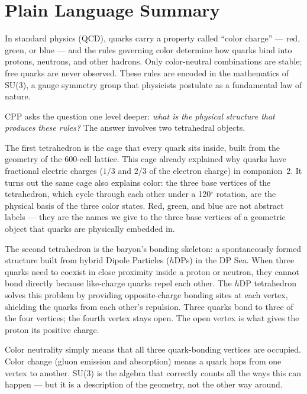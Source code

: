 \documentclass[12pt]{article}
\newcommand{\hDP}{h\mathrm{DP}}
\begin{document}
\section*{Plain Language Summary}

In standard physics (QCD), quarks carry a property called ``color
charge'' --- red, green, or blue --- and the rules governing color
determine how quarks bind into protons, neutrons, and other hadrons.
Only color-neutral combinations are stable; free quarks are never
observed.  These rules are encoded in the mathematics of SU(3), a
gauge symmetry group that physicists postulate as a fundamental law
of nature.

CPP asks the question one level deeper: \emph{what is the physical
structure that produces these rules?}  The answer involves two
tetrahedral objects.

The first tetrahedron is the cage that every quark sits inside,
built from the geometry of the 600-cell lattice.  This cage already
explained why quarks have fractional electric charges ($1/3$ and
$2/3$ of the electron charge) in companion~2.  It turns out the same
cage also explains color: the three base vertices of the tetrahedron,
which cycle through each other under a 120$^\circ$ rotation, are
the physical basis of the three color states.  Red, green, and blue
are not abstract labels --- they are the names we give to the three
base vertices of a geometric object that quarks are physically
embedded in.

The second tetrahedron is the baryon's bonding skeleton: a
spontaneously formed structure built from hybrid Dipole Particles
($\hDP$s) in the DP Sea.  When three quarks need to coexist in close
proximity inside a proton or neutron, they cannot bond directly
because like-charge quarks repel each other.  The $\hDP$ tetrahedron
solves this problem by providing opposite-charge bonding sites at
each vertex, shielding the quarks from each other's repulsion.  Three
quarks bond to three of the four vertices; the fourth vertex stays
open.  The open vertex is what gives the proton its positive charge.

Color neutrality simply means that all three quark-bonding vertices
are occupied.  Color change (gluon emission and absorption) means a
quark hops from one vertex to another.  SU(3) is the algebra that
correctly counts all the ways this can happen --- but it is a
description of the geometry, not the other way around.
\end{document}
